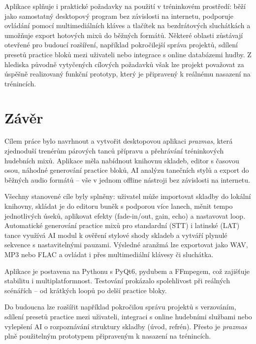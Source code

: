 \documentclass[12pt, a4paper,
]{report}
\begin{document}
Aplikace splňuje i praktické požadavky na použití v tréninkovém prostředí: běží jako samostatný desktopový program bez závislosti na internetu, podporuje ovládání pomocí multimediálních kláves a tlačítek na bezdrátových sluchátkách a umožňuje export hotových mixů do běžných formátů. Některé oblasti zůstávají otevřené pro budoucí rozšíření, například pokročilejší správa projektů, sdílení presetů practice bloků mezi uživateli nebo integrace s online databázemi hudby. Z hlediska původně vytyčených cílových požadavků však lze projekt považovat za úspěšně realizovaný funkční prototyp, který je připravený k reálnému nasazení na trénincích.


\chapter*{Závěr}

Cílem práce bylo navrhnout a vytvořit desktopovou aplikaci \textit{prazmas}, která zjednoduší trenérům párových tanců přípravu a přehrávání tréninkových hudebních mixů. Aplikace měla nabídnout knihovnu skladeb, editor s časovou osou, náhodné generování practice bloků, AI analýzu tanečních stylů a export do běžných audio formátů – vše v jednom offline nástroji bez závislosti na internetu.

Všechny stanovené cíle byly splněny: uživatel může importovat skladby do lokální knihovny, skládat je do editoru buněk s podporou více lanech, měnit tempo jednotlivých úseků, aplikovat efekty (fade-in/out, gain, echo) a nastavovat loop. Automatické generování practice mixů pro standardní (STT) i latinské (LAT) tance využívá AI modul k ověření stylové shody skladeb a vytváří plynulé sekvence s nastavitelnými pauzami. Výsledné aranžmá lze exportovat jako WAV, MP3 nebo FLAC a ovládat i přes multimediální klávesy či sluchátka.

Aplikace je postavena na Pythonu s PyQt6, pydubem a FFmpegem, což zajišťuje stabilitu i multiplatformnost. Testování prokázalo spolehlivost při reálných scénářích – od krátkých loopů po delší practice bloky.

Do budoucna lze rozšířit například pokročilou správu projektů s verzováním, sdílení presetů practice mezi uživateli, integraci s online hudebními službami nebo vylepšení AI o rozpoznávání struktury skladby (úvod, refrén). Přesto je \textit{prazmas} plně použitelným prototypem připraveným k nasazení na trénincích.
\end{document}
